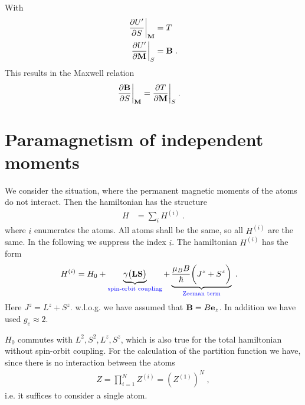 With
%
\begin{align*}
\frac{\partial U'}{\partial S}\bigg|_{\mathbf M}&= T\\
\frac{\partial U'}{\partial \mathbf M}\bigg|_{S}&= \mathbf B\;.
\end{align*}
%
This results in the Maxwell relation
%
\begin{align*}
\frac{\partial \mathbf B}{\partial S}\bigg|_{\mathbf M}&=\frac{\partial T}{\partial \mathbf M}\bigg|_{S}\;.
\end{align*}
%
\section{Paramagnetism of independent moments}

We consider the situation, where the permanent magnetic moments of the atoms do not interact.
Then the hamiltonian has the structure
%
\begin{align*}
H &= \sum_{i} H^{(i)}\;.
\end{align*}
%
where $i$ enumerates the atoms. All atoms shall be the same, so all $H^{(i)}$ are the same.
In the following we suppress the index $i$. The hamiltonian $H^{(i)}$ has the form
%
\begin{align}\label{eq:H:spin:orbit:a}
H^{(i)} &= H_{0} + \underbrace{
\gamma\big( \mathbf L\mathbf S \big)
}_{\color{blue}  \text{spin-orbit coupling}}
+\underbrace{
\frac{\mu_{B} B}{\hbar} \bigg( J^{z} + S^{z}\bigg)
}_{\color{blue} \text{Zeeman term} }\;.
\end{align}
%
Here  $J^{z} = L^{z} + S^{z}$.
w.l.o.g. we have assumed that $\mathbf B = B \mathbf e_{z}$. In addition we have used $g_{e}\approx 2$.

$H_{0}$ commutes with $L^{2},S^{2},L^{z},S^{z}$, which is also true for the total hamiltonian without spin-orbit coupling. For the calculation of the partition function we have, since there is no interaction between the atoms
%
\begin{align*}
Z = \prod_{i=1}^N Z^{(i)} = (Z^{(1)})^N \; ,
\end{align*}
%
i.e. it suffices to consider a single atom.
